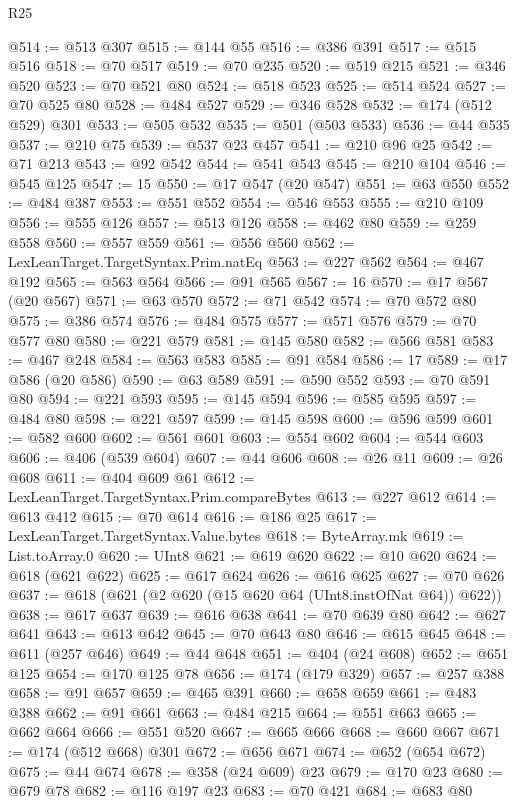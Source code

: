 \begin{lexlean}{R25}
\begin{coremodule}
@514 := @513 @307
@515 := @144 @55
@516 := @386 @391
@517 := @515 @516
@518 := @70 @517
@519 := @70 @235
@520 := @519 @215
@521 := @346 @520
@523 := @70 @521 @80
@524 := @518 @523
@525 := @514 @524
@527 := @70 @525 @80
@528 := @484 @527
@529 := @346 @528
@532 := @174 (@512 @529) @301
@533 := @505 @532
@535 := @501 (@503 @533)
@536 := @44 @535
@537 := @210 @75
@539 := @537 @23 @457
@541 := @210 @96 @25
@542 := @71 @213
@543 := @92 @542
@544 := @541 @543
@545 := @210 @104
@546 := @545 @125
@547 := 15
@550 := @17 @547 (@20 @547)
@551 := @63 @550
@552 := @484 @387
@553 := @551 @552
@554 := @546 @553
@555 := @210 @109
@556 := @555 @126
@557 := @513 @126
@558 := @462 @80
@559 := @259 @558
@560 := @557 @559
@561 := @556 @560
@562 := LexLeanTarget.TargetSyntax.Prim.natEq
@563 := @227 @562
@564 := @467 @192
@565 := @563 @564
@566 := @91 @565
@567 := 16
@570 := @17 @567 (@20 @567)
@571 := @63 @570
@572 := @71 @542
@574 := @70 @572 @80
@575 := @386 @574
@576 := @484 @575
@577 := @571 @576
@579 := @70 @577 @80
@580 := @221 @579
@581 := @145 @580
@582 := @566 @581
@583 := @467 @248
@584 := @563 @583
@585 := @91 @584
@586 := 17
@589 := @17 @586 (@20 @586)
@590 := @63 @589
@591 := @590 @552
@593 := @70 @591 @80
@594 := @221 @593
@595 := @145 @594
@596 := @585 @595
@597 := @484 @80
@598 := @221 @597
@599 := @145 @598
@600 := @596 @599
@601 := @582 @600
@602 := @561 @601
@603 := @554 @602
@604 := @544 @603
@606 := @406 (@539 @604)
@607 := @44 @606
@608 := @26 @11
@609 := @26 @608
@611 := @404 @609 @61
@612 := LexLeanTarget.TargetSyntax.Prim.compareBytes
@613 := @227 @612
@614 := @613 @412
@615 := @70 @614
@616 := @186 @25
@617 := LexLeanTarget.TargetSyntax.Value.bytes
@618 := ByteArray.mk
@619 := List.toArray.{0}
@620 := UInt8
@621 := @619 @620
@622 := @10 @620
@624 := @618 (@621 @622)
@625 := @617 @624
@626 := @616 @625
@627 := @70 @626
@637 := @618 (@621 (@2 @620 (@15 @620 @64 (UInt8.instOfNat @64)) @622))
@638 := @617 @637
@639 := @616 @638
@641 := @70 @639 @80
@642 := @627 @641
@643 := @613 @642
@645 := @70 @643 @80
@646 := @615 @645
@648 := @611 (@257 @646)
@649 := @44 @648
@651 := @404 (@24 @608)
@652 := @651 @125
@654 := @170 @125 @78
@656 := @174 (@179 @329)
@657 := @257 @388
@658 := @91 @657
@659 := @465 @391
@660 := @658 @659
@661 := @483 @388
@662 := @91 @661
@663 := @484 @215
@664 := @551 @663
@665 := @662 @664
@666 := @551 @520
@667 := @665 @666
@668 := @660 @667
@671 := @174 (@512 @668) @301
@672 := @656 @671
@674 := @652 (@654 @672)
@675 := @44 @674
@678 := @358 (@24 @609) @23
@679 := @170 @23
@680 := @679 @78
@682 := @116 @197 @23
@683 := @70 @421
@684 := @683 @80

\end{coremodule}
\end{lexlean}
